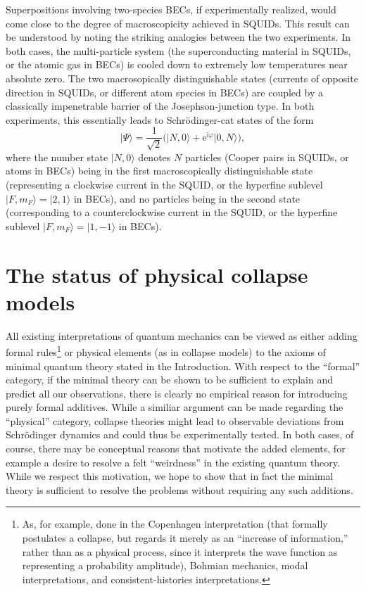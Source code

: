 \documentclass[twocolumn,aps,floatfix,amsmath,amssymb,showpacs,nofootinbib]{revtex4}
\newcommand{\be}{\begin{equation}} \newcommand{\ee}{\end{equation}}
\newcommand{\ket}[1]{\ensuremath{|{#1\rangle}}}
\newcommand{\e}{\ensuremath{\mathrm{e}}}
\begin{document}
Superpositions involving two-species BECs, if experimentally realized,
would come close to the degree of macroscopicity achieved in SQUIDs.
This result can be understood by noting the striking analogies between
the two experiments. In both cases, the multi-particle system (the
superconducting material in SQUIDs, or the atomic gas in BECs) is
cooled down to extremely low temperatures near absolute zero. The two
macrosopically distinguishable states (currents of opposite direction
in SQUIDs, or different atom species in BECs) are coupled by a
classically impenetrable barrier of the Josephson-junction type. In
both experiments, this essentially leads to Schr\"odinger-cat states
of the form
%
\be 
\ket{\Psi} = \frac{1}{\sqrt{2}} \bigl( \ket{N,0} + \e^{\mathrm{i}\varphi}
\ket{0,N} \bigr),
\ee 
%
where the number state $\ket{N,0}$ denotes $N$ particles (Cooper pairs
in SQUIDs, or atoms in BECs) being in the first macroscopically
distinguishable state (representing a clockwise current in the SQUID,
or the hyperfine sublevel $\ket{F,m_F} = \ket{2,1}$ in BECs), and no
particles being in the second state (corresponding to a
counterclockwise current in the SQUID, or the hyperfine sublevel
$\ket{F,m_F} = \ket{1,-1}$ in BECs).


\section{The status of physical collapse models}  \label{sec:physcoll}

All existing interpretations of quantum mechanics can be viewed as
either adding formal rules\footnote{As, for example, done in the
  Copenhagen interpretation (that formally postulates a collapse, but
  regards it merely as an ``increase of information,'' rather than as
  a physical process, since it interprets the wave function as
  representing a probability amplitude), Bohmian mechanics, modal
  interpretations, and consistent-histories interpretations.} or
physical elements (as in collapse models) to the axioms of minimal
quantum theory stated in the Introduction. With respect to the
``formal'' category, if the minimal theory can be shown to be
sufficient to explain and predict all our observations, there is
clearly no empirical reason for introducing purely formal additives.
While a similiar argument can be made regarding the ``physical''
category, collapse theories might lead to observable deviations from
Schr\"odinger dynamics and could thus be experimentally tested.  In
both cases, of course, there may be conceptual reasons that motivate
the added elements, for example a desire to resolve a felt
``weirdness'' in the existing quantum theory. While we respect this
motivation, we hope to show that in fact the minimal theory is
sufficient to resolve the problems without requiring any such
additions.
\end{document}
